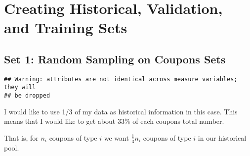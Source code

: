 \documentclass[10pt]{report}
\newenvironment{Shaded}{}{}
\newcommand{\KeywordTok}[1]{\textcolor[rgb]{0.00,0.44,0.13}{\textbf{{#1}}}}
\newcommand{\DataTypeTok}[1]{\textcolor[rgb]{0.56,0.13,0.00}{{#1}}}
\newcommand{\StringTok}[1]{\textcolor[rgb]{0.25,0.44,0.63}{{#1}}}
\newcommand{\NormalTok}[1]{{#1}}
\begin{document}
\section{Creating Historical, Validation, and Training
Sets}\label{creating-historical-validation-and-training-sets}

\subsection{Set 1: Random Sampling on Coupons
Sets}\label{set-1-random-sampling-on-coupons-sets}

\begin{Shaded}
\end{Shaded}

\begin{verbatim}
## Warning: attributes are not identical across measure variables; they will
## be dropped
\end{verbatim}

I would like to use 1/3 of my data as historical information in this
case. This means that I would like to get about 33\% of each coupons
total number.

That is, for \(n_i\) coupons of type \(i\) we want \(\frac{1}{3} n_i\)
coupons of type \(i\) in our historical pool.
\end{document}
